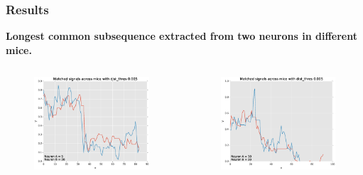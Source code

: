 \documentclass{beamer}
\begin{document}
\begin{frame}
    \frametitle{Results}
    \textbf{Longest common subsequence extracted from two neurons in different mice.}
    \begin{columns}[c]
    \begin{figure}
    \includegraphics[width=\linewidth]{img/rlcsMain_getSegs_2016_04_12_08_09_50}
    \end{figure}

    \begin{figure}
    \includegraphics[width=\linewidth]{img/rlcsMain_getSegs_2016_04_12_08_12_31}
    \end{figure}
    \end{columns}
\end{frame}
\end{document}
